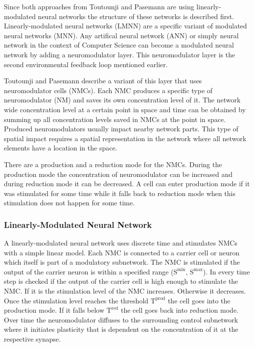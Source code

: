 \documentclass[12pt,twoside]{scrartcl}
\theoremstyle{plain}
\theoremstyle{definition}
\theoremstyle{remark}
\begin{document}
Since both approaches from Toutounji and Pasemann are using linearly-modulated
neural networks the structure of these networks is described first. Linearly-modulated
neural networks (LMNN) are a specific variant of modulated neural
networks (MNN). Any artifical neural network (ANN) or simply neural network
in the context of Computer Science can become a modulated neural network by
adding a neuromodulator layer. This neuromodulator layer is the second
environmental feedback loop mentioned earlier.

Toutounji and Pasemann describe a variant of this layer that uses neuromodulator
cells (NMCs). Each NMC produces a specific type of neuromodulator (NM) and
saves its own concentration level of it. The network wide concentration level at
a certain point in space and time can be obtained by summing up all concentration
levels saved in NMCs at the point in space. Produced neuromodulators usually
impact nearby network parts. This type of spatial impact requires a spatial
representation in the network where all network elements have a location in
the space.

There are a production and a reduction mode for the NMCs. During the production
mode the concentration of neuromodulator can be increased and during reduction
mode it can be decreased. A cell can enter production mode if it was stimulated
for some time while it falls back to reduction mode when this stimulation
does not happen for some time.

\subsubsection*{Linearly-Modulated Neural Network}

A linearly-modulated neural network uses discrete time and stimulates NMCs
with a simple linear model. Each NMC is connected to a carrier cell or neuron
which itself is part of a modulatory subnetwork. The NMC is stimulated if the
output of the carrier neuron is within a specified range
(\(\text{S}^{\text{min}}\), \(\text{S}^{\text{max}}\)). In every time step
is checked if the output of the carrier cell is high enough to stimulate the
NMC. If it is the stimulation level of the NMC increases. Otherwise it decreases.
Once the stimulation level reaches the threshold \(\text{T}^{\text{prod}}\)
the cell goes into the production mode. If it falls below \(\text{T}^{\text{red}}\)
the cell goes back into reduction mode.
Over time the neuromodulator diffuses to the surrounding control subnetwork
where it initiates plasticity that is dependent on the concentration of it at
the respective synapse.
\end{document}
